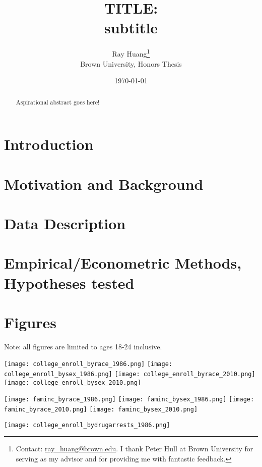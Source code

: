 \documentclass{article}
\title{TITLE:\texorpdfstring{\\}{} subtitle}
\author{Ray Huang\thanks{Contact:
    \href{mailto:ray_huang@brown.edu}{ray\_huang@brown.edu}.
     I thank Peter Hull at Brown University for serving as my advisor and for providing me with fantastic feedback.}
     \\Brown University, Honors Thesis}
\date{\today}
\begin{document}
\maketitle

\begin{abstract}
\noindent Aspirational abstract goes here!
\end{abstract}

\clearpage

\section*{Introduction}

\section*{Motivation and Background}

\section*{Data Description}


\section*{Empirical/Econometric Methods, Hypotheses tested}

\section*{Figures}

Note: all figures are limited to ages 18-24 inclusive.

\begin{center}
\texttt{[image: college\_enroll\_byrace\_1986.png]}
\texttt{[image: college\_enroll\_bysex\_1986.png]}
\texttt{[image: college\_enroll\_byrace\_2010.png]}
\texttt{[image: college\_enroll\_bysex\_2010.png]}
\end{center}

\begin{center}
  \texttt{[image: faminc\_byrace\_1986.png]}
  \texttt{[image: faminc\_bysex\_1986.png]}
  \texttt{[image: faminc\_byrace\_2010.png]}
  \texttt{[image: faminc\_bysex\_2010.png]}
\end{center}

\texttt{[image: college\_enroll\_bydrugarrests\_1986.png]}
\end{document}
